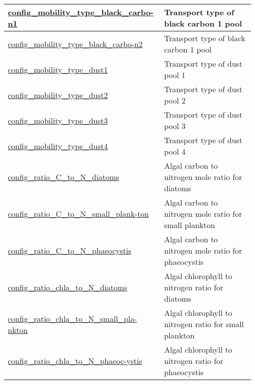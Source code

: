 {\begin{center}
\begin{longtable}{| p{2.0in} || p{4.0in} |}
    \hline
    \hyperref[subsec:nm_sec_config_mobility_type_black_carbon1]{config\_mobility\_type\_black\_carbo-}\hyperref[subsec:nm_sec_config_mobility_type_black_carbon1]{n1}& Transport type of black carbon 1 pool \\
    \hline
    \hyperref[subsec:nm_sec_config_mobility_type_black_carbon2]{config\_mobility\_type\_black\_carbo-}\hyperref[subsec:nm_sec_config_mobility_type_black_carbon2]{n2}& Transport type of black carbon 1 pool \\
    \hline
    \hyperref[subsec:nm_sec_config_mobility_type_dust1]{config\_mobility\_type\_dust1} & Transport type of dust pool 1 \\
    \hline
    \hyperref[subsec:nm_sec_config_mobility_type_dust2]{config\_mobility\_type\_dust2} & Transport type of dust pool 2 \\
    \hline
    \hyperref[subsec:nm_sec_config_mobility_type_dust3]{config\_mobility\_type\_dust3} & Transport type of dust pool 3 \\
    \hline
    \hyperref[subsec:nm_sec_config_mobility_type_dust4]{config\_mobility\_type\_dust4} & Transport type of dust pool 4 \\
    \hline
    \hyperref[subsec:nm_sec_config_ratio_C_to_N_diatoms]{config\_ratio\_C\_to\_N\_diatoms} & Algal carbon to nitrogen mole ratio for diatoms \\
    \hline
    \hyperref[subsec:nm_sec_config_ratio_C_to_N_small_plankton]{config\_ratio\_C\_to\_N\_small\_plank-}\hyperref[subsec:nm_sec_config_ratio_C_to_N_small_plankton]{ton}& Algal carbon to nitrogen mole ratio for small plankton \\
    \hline
    \hyperref[subsec:nm_sec_config_ratio_C_to_N_phaeocystis]{config\_ratio\_C\_to\_N\_phaeocystis} & Algal carbon to nitrogen mole ratio for phaeocystis \\
    \hline
    \hyperref[subsec:nm_sec_config_ratio_chla_to_N_diatoms]{config\_ratio\_chla\_to\_N\_diatoms} & Algal chlorophyll to nitrogen ratio for diatoms \\
    \hline
    \hyperref[subsec:nm_sec_config_ratio_chla_to_N_small_plankton]{config\_ratio\_chla\_to\_N\_small\_pla-}\hyperref[subsec:nm_sec_config_ratio_chla_to_N_small_plankton]{nkton}& Algal chlorophyll to nitrogen ratio for small plankton \\
    \hline
    \hyperref[subsec:nm_sec_config_ratio_chla_to_N_phaeocystis]{config\_ratio\_chla\_to\_N\_phaeoc-}\hyperref[subsec:nm_sec_config_ratio_chla_to_N_phaeocystis]{ystis}& Algal chlorophyll to nitrogen ratio for phaeocystis \\

\end{longtable}
\end{center}}

